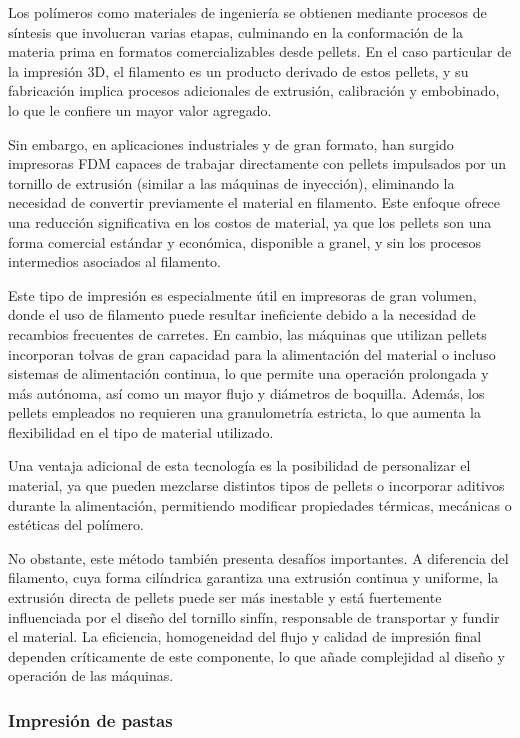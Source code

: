 Los polímeros como materiales de ingeniería se obtienen mediante procesos de síntesis que involucran varias etapas, culminando en la conformación de la materia prima en formatos comercializables desde pellets. En el caso particular de la impresión 3D, el filamento es un producto derivado de estos pellets, y su fabricación implica procesos adicionales de extrusión, calibración y embobinado, lo que le confiere un mayor valor agregado.

Sin embargo, en aplicaciones industriales y de gran formato, han surgido impresoras FDM capaces de trabajar directamente con pellets impulsados por un tornillo de extrusión (similar a las máquinas de inyección), eliminando la necesidad de convertir previamente el material en filamento. Este enfoque ofrece una reducción significativa en los costos de material, ya que los pellets son una forma comercial estándar y económica, disponible a granel, y sin los procesos intermedios asociados al filamento.

Este tipo de impresión es especialmente útil en impresoras de gran volumen, donde el uso de filamento puede resultar ineficiente debido a la necesidad de recambios frecuentes de carretes. En cambio, las máquinas que utilizan pellets incorporan tolvas de gran capacidad para la alimentación del material o incluso sistemas de alimentación continua, lo que permite una operación prolongada y más autónoma, así como un mayor flujo y diámetros de boquilla. Además, los pellets empleados no requieren una granulometría estricta, lo que aumenta la flexibilidad en el tipo de material utilizado.

Una ventaja adicional de esta tecnología es la posibilidad de personalizar el material, ya que pueden mezclarse distintos tipos de pellets o incorporar aditivos durante la alimentación, permitiendo modificar propiedades térmicas, mecánicas o estéticas del polímero.  

No obstante, este método también presenta desafíos importantes. A diferencia del filamento, cuya forma cilíndrica garantiza una extrusión continua y uniforme, la extrusión directa de pellets puede ser más inestable y está fuertemente influenciada por el diseño del tornillo sinfín, responsable de transportar y fundir el material. La eficiencia, homogeneidad del flujo y calidad de impresión final dependen críticamente de este componente, lo que añade complejidad al diseño y operación de las máquinas.

\subsubsection{Impresión de pastas}

